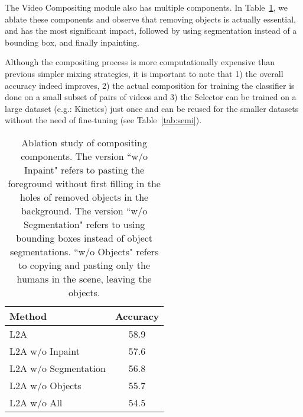 \documentclass[runningheads]{llncs}
\newcommand{\MethodShort}{L2A\xspace}
\newcommand{\VideoMix}{Video Compositing\xspace}
\begin{document}
The \VideoMix module also has multiple components. In Table~\ref{table:ablation_mix}, we ablate these components and observe that removing objects is actually essential, and has the most significant impact, followed by using segmentation instead of a bounding box, and finally inpainting. 

Although the compositing process is more computationally expensive than previous simpler mixing strategies, it is important to note that 1) the overall accuracy indeed improves, 2) the actual composition for training the classifier is done on a small subset of pairs of videos and 3) the Selector can be trained on a large dataset (e.g.: Kinetics) just once and can be reused for the smaller datasets without the need of fine-tuning (see Table~\ref{tab:semi}). 

\begin{table}[t]
\centering
\begin{tabular}{lc}
Method                  & Accuracy \\
\hline
\MethodShort                    & 58.9     \\
\MethodShort w/o Inpaint        & 57.6     \\
\MethodShort w/o Segmentation       & 56.8     \\
\MethodShort w/o Objects & 55.7    \\
\MethodShort w/o All & 54.5 \\
\end{tabular}
\caption{Ablation study of compositing components. The version ``w/o Inpaint" refers to pasting the foreground without first filling in the holes of removed objects in the background. The version ``w/o Segmentation" refers to using bounding boxes instead of object segmentations. ``w/o Objects" refers to copying and pasting only the humans in the scene, leaving the objects. }
\vspace{-0.5cm}
\label{table:ablation_mix}
\end{table}
\end{document}
